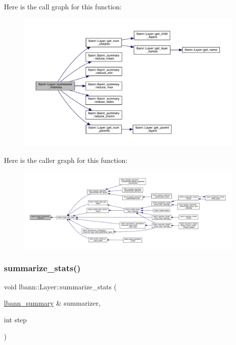 Here is the call graph for this function\+:\nopagebreak
\begin{figure}[H]
\begin{center}
\leavevmode
\includegraphics[width=350pt]{classlbann_1_1Layer_af7e50932bb60d4cab3b21ab3fb0707ea_cgraph}
\end{center}
\end{figure}
Here is the caller graph for this function\+:\nopagebreak
\begin{figure}[H]
\begin{center}
\leavevmode
\includegraphics[width=350pt]{classlbann_1_1Layer_af7e50932bb60d4cab3b21ab3fb0707ea_icgraph}
\end{center}
\end{figure}
\mbox{\label{classlbann_1_1Layer_a7f3f26e2ae0497f9a00fd6bc56b50543}} 
\subsubsection{\texorpdfstring{summarize\+\_\+stats()}{summarize\_stats()}}
{\footnotesize\ttfamily void lbann\+::\+Layer\+::summarize\+\_\+stats (\begin{DoxyParamCaption}\item[{\hyperlink{classlbann_1_1lbann__summary}{lbann\+\_\+summary} \&}]{summarizer,  }\item[{int}]{step }\end{DoxyParamCaption})\hspace{0.3cm}{\ttfamily [virtual]}}



